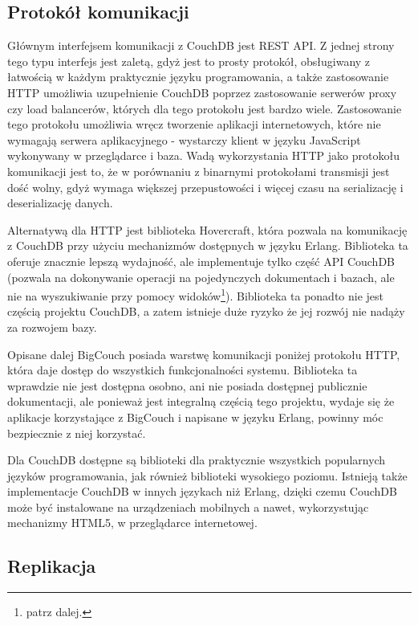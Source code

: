 \subsection*{Protokół komunikacji}

Głównym interfejsem komunikacji z CouchDB jest REST API.
Z jednej strony tego typu interfejs jest zaletą, gdyż jest to prosty protokół, obsługiwany z łatwością w każdym praktycznie języku programowania, a także zastosowanie HTTP umożliwia uzupełnienie CouchDB poprzez zastosowanie serwerów proxy czy load balancerów, których dla tego protokołu jest bardzo wiele.
Zastosowanie tego protokołu umożliwia wręcz tworzenie aplikacji internetowych, które nie wymagają serwera aplikacyjnego - wystarczy klient w języku JavaScript wykonywany w przeglądarce i baza.
Wadą wykorzystania HTTP jako protokołu komunikacji jest to, że w porównaniu z binarnymi protokołami transmisji jest dość wolny, gdyż wymaga większej przepustowości i więcej czasu na serializację i deserializację danych.

Alternatywą dla HTTP jest biblioteka Hovercraft, która pozwala na komunikację z CouchDB przy użyciu mechanizmów dostępnych w języku Erlang.
Biblioteka ta oferuje znacznie lepszą wydajność, ale implementuje tylko część API CouchDB (pozwala na dokonywanie operacji na pojedynczych dokumentach i bazach, ale nie na wyszukiwanie przy pomocy widoków\footnote{patrz dalej.}).
Biblioteka ta ponadto nie jest częścią projektu CouchDB, a zatem istnieje duże ryzyko że jej rozwój nie nadąży za rozwojem bazy.

Opisane dalej BigCouch posiada warstwę komunikacji poniżej protokołu HTTP, która daje dostęp do wszystkich funkcjonalności systemu.
Biblioteka ta wprawdzie nie jest dostępna osobno, ani nie posiada dostępnej publicznie dokumentacji, ale ponieważ jest integralną częścią tego projektu, wydaje się że aplikacje korzystające z BigCouch i napisane w języku Erlang, powinny móc bezpiecznie z niej korzystać.

Dla CouchDB dostępne są biblioteki dla praktycznie wszystkich popularnych języków programowania, jak również biblioteki wysokiego poziomu.
Istnieją także implementacje CouchDB w innych językach niż Erlang, dzięki czemu CouchDB może być instalowane na urządzeniach mobilnych a nawet, wykorzystując mechanizmy HTML5, w przeglądarce internetowej.

\subsection*{Replikacja}

